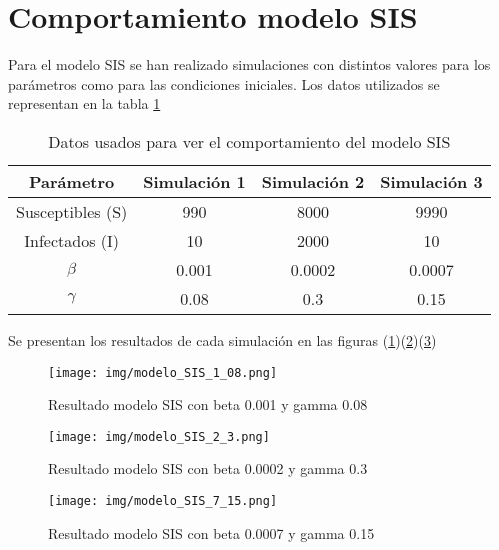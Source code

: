 \section{Comportamiento modelo SIS}
Para el modelo SIS se han realizado simulaciones con distintos
valores para los parámetros como para las condiciones iniciales. Los datos utilizados se representan en la tabla \ref{tab:datos para modelo SIS}
\begin{table}[H]
\centering
\begin{tabular}{|c|c|c|c|}
\hline
\textbf{Parámetro} & \textbf{Simulación 1} & \textbf{Simulación 2}  & \textbf{Simulación 3}\\
\hline
Susceptibles (S) & 990 & 8000 & 9990\\
\hline
Infectados (I)   & 10   & 2000 & 10  \\
\hline
\(\beta\)        & 0.001 & 0.0002  & 0.0007\\
\hline
\(\gamma\)        & 0.08 & 0.3 & 0.15\\
\hline
\end{tabular}
\caption{Datos usados para ver el comportamiento del modelo SIS}
\label{tab:datos para modelo SIS}
\end{table}

Se presentan los resultados de cada simulación en las figuras (\ref{fig:simulacion 1 SIS})(\ref{fig:simulación 2 SIS})(\ref{fig:Simulación 3 SIS})

\begin{figure}[H]
    \centering
    \texttt{[image: img/modelo\_SIS\_1\_08.png]}
    \caption{Resultado modelo SIS con beta 0.001 y gamma 0.08}
    \label{fig:simulacion 1 SIS}
    \vspace{0.5cm} %
\end{figure}

\begin{figure}[H]
    \centering
    \texttt{[image: img/modelo\_SIS\_2\_3.png]}
    \caption{Resultado modelo SIS con beta 0.0002 y gamma 0.3}
    \label{fig:simulación 2 SIS}
    \vspace{0.5cm} %
\end{figure}

\begin{figure}[H]
    \centering
    \texttt{[image: img/modelo\_SIS\_7\_15.png]}
    \caption{Resultado modelo SIS con beta 0.0007 y gamma 0.15}
    \label{fig:Simulación 3 SIS}
    \vspace{0.5cm} %
\end{figure}

